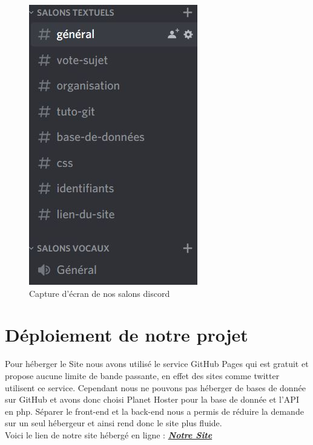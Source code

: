 \documentclass[12pt]{report}
\begin{document}
	\begin{figure}[h!]
	\begin{center}
		\includegraphics[scale=0.7]{discord.jpg}
	\end{center}
		\caption{Capture d'écran de nos salons discord}
\end{figure}
\clearpage
\section{Déploiement de notre projet}
Pour héberger le Site nous avons utilisé le service GitHub\cite{GitHub} Pages qui est gratuit et propose aucune limite de bande passante, en effet des sites comme twitter utilisent ce service.
Cependant nous  ne pouvons pas héberger de bases de donnée sur GitHub et avons donc choisi Planet Hoster\cite{Planet} pour la base de donnée et l'API en php. Séparer le front-end et la back-end nous a permis de réduire la demande sur un seul hébergeur et ainsi rend donc le site plus fluide.\\
Voici le lien de notre site hébergé en ligne :
\href{https://florentbednarek.github.io/projetwebEISTI}{\textbf{\emph{Notre Site}}}\\
\\
\\
\end{document}
